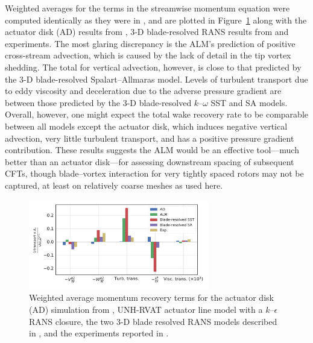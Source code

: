 \documentclass[times]{weauth}
\begin{document}

Weighted averages for the terms in the streamwise momentum equation were
computed identically as they were in \cite{Bachant2015-JoT,Bachant2016-BR-CFD},
and are plotted in Figure~\ref{fig:RVAT-ALM-recovery} along with the actuator
disk (AD) results from \cite{Bachant2015-JoT}, 3-D blade-resolved RANS results
from \cite{Bachant2016-BR-CFD} and experiments. The most glaring discrepancy is
the ALM's prediction of positive cross-stream advection, which is caused by the
lack of detail in the tip vortex shedding. The total for vertical advection,
however, is close to that predicted by the 3-D blade-resolved Spalart--Allmaras
model. Levels of turbulent transport due to eddy viscosity and deceleration due
to the adverse pressure gradient are between those predicted by the 3-D
blade-resolved $k$--$\omega$ SST and SA models. Overall, however, one might
expect the total wake recovery rate to be comparable between all models except
the actuator disk, which induces negative vertical advection, very little
turbulent transport, and has a positive pressure gradient contribution. These
results suggests the ALM would be an effective tool---much better than an
actuator disk---for assessing downstream spacing of subsequent CFTs, though
blade--vortex interaction for very tightly spaced rotors may not be captured, at
least on relatively coarse meshes as used here.

\begin{figure}
    \centering

    \includegraphics[width=0.7\textwidth]{RVAT-ALM_recovery-bar-chart}

    \caption{Weighted average momentum recovery terms for the actuator disk (AD)
        simulation from \cite{Bachant2015-JoT}, UNH-RVAT actuator line model with a
        $k$--$\epsilon$ RANS closure, the two 3-D blade resolved RANS models
        described in \cite{Bachant2016-BR-CFD}, and the experiments reported in
        \cite{Bachant2015-JoT}.}

    \label{fig:RVAT-ALM-recovery}
\end{figure}
\end{document}
